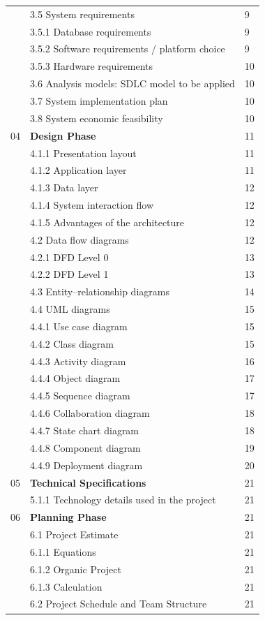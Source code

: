 \begin{longtable}{|p{1cm}|p{12cm}|p{1.5cm}|}
   & 3.5 System requirements & 9\\
  & 3.5.1 Database requirements & 9\\
& 3.5.2 Software requirements / platform choice & 9\\

   & 3.5.3 Hardware requirements & 10\\ \hline   
   & 3.6 Analysis models: SDLC model to be applied & 10\\
   & 3.7 System implementation plan & 10\\
   & 3.8 System economic feasibility & 10\\
\hline
04 & \textbf{Design Phase} & 11\\
   & 4.1.1 Presentation layout & 11\\
   & 4.1.2 Application layer & 11\\
   & 4.1.3 Data layer & 12\\
   & 4.1.4 System interaction flow & 12\\
   & 4.1.5 Advantages of the architecture & 12\\
   & 4.2 Data flow diagrams & 12\\
   & 4.2.1 DFD Level 0 & 13\\
   & 4.2.2 DFD Level 1 & 13\\
   & 4.3 Entity–relationship diagrams & 14\\
   & 4.4 UML diagrams & 15\\
   & 4.4.1 Use case diagram & 15\\
   & 4.4.2 Class diagram & 15\\
   & 4.4.3 Activity diagram & 16\\
   & 4.4.4 Object diagram & 17\\
   & 4.4.5 Sequence diagram & 17\\
   & 4.4.6 Collaboration diagram & 18\\
   & 4.4.7 State chart diagram & 18\\
   & 4.4.8 Component diagram & 19\\
   & 4.4.9 Deployment diagram & 20\\
\hline
05 & \textbf{Technical Specifications} & 21\\
   & 5.1.1 Technology details used in the project & 21\\

\hline
06 & \textbf{Planning Phase} & 21\\
   & 6.1 Project Estimate & 21\\
   & 6.1.1 Equations & 21\\
   & 6.1.2 Organic Project & 21\\
   & 6.1.3 Calculation & 21\\
   & 6.2 Project Schedule and Team Structure & 21\\


\end{longtable}
